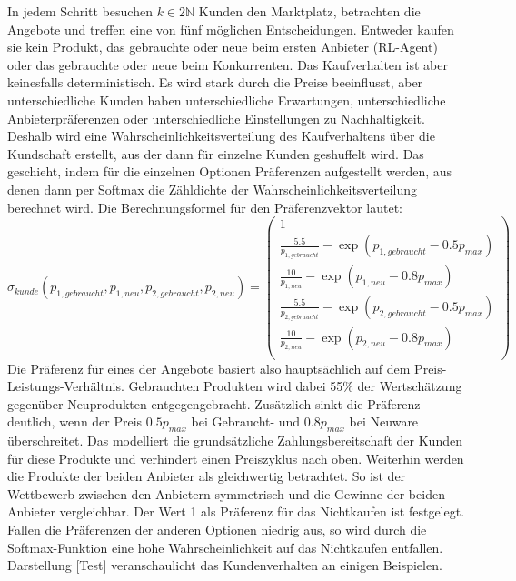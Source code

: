 In jedem Schritt besuchen $k \in 2\mathbb{N}$ Kunden den Marktplatz, betrachten die Angebote und treffen eine von fünf möglichen Entscheidungen.
Entweder kaufen sie kein Produkt, das gebrauchte oder neue beim ersten Anbieter (RL-Agent) oder das gebrauchte oder neue beim Konkurrenten.
Das Kaufverhalten ist aber keinesfalls deterministisch.
Es wird stark durch die Preise beeinflusst, aber unterschiedliche Kunden haben unterschiedliche Erwartungen, unterschiedliche Anbieterpräferenzen oder unterschiedliche Einstellungen zu Nachhaltigkeit.
Deshalb wird eine Wahrscheinlichkeitsverteilung des Kaufverhaltens über die Kundschaft erstellt, aus der dann für einzelne Kunden geshuffelt wird.
Das geschieht, indem für die einzelnen Optionen Präferenzen aufgestellt werden, aus denen dann per Softmax die Zähldichte der Wahrscheinlichkeitsverteilung berechnet wird.
Die Berechnungsformel für den Präferenzvektor lautet:
\begin{equation}
    \sigma_{kunde}(p_{1, gebraucht}, p_{1, neu}, p_{2, gebraucht}, p_{2, neu}) =
    \begin{pmatrix}
        1\\
        \frac{5.5}{p_{1, gebraucht}} - \exp{(p_{1, gebraucht} - 0.5 p_{max})}\\
        \frac{10}{p_{1, neu}} - \exp{(p_{1, neu} - 0.8 p_{max})}\\
        \frac{5.5}{p_{2, gebraucht}} - \exp{(p_{2, gebraucht} - 0.5 p_{max})}\\
        \frac{10}{p_{2, neu}} - \exp{(p_{2, neu} - 0.8 p_{max})}\\
    \end{pmatrix}
\end{equation}
Die Präferenz für eines der Angebote basiert also hauptsächlich auf dem Preis-Leistungs-Verhältnis.
Gebrauchten Produkten wird dabei 55\% der Wertschätzung gegenüber Neuprodukten entgegengebracht.
Zusätzlich sinkt die Präferenz deutlich, wenn der Preis $0.5 p_{max}$ bei Gebraucht- und $0.8 p_{max}$ bei Neuware überschreitet.
Das modelliert die grundsätzliche Zahlungsbereitschaft der Kunden für diese Produkte und verhindert einen Preiszyklus nach oben.
Weiterhin werden die Produkte der beiden Anbieter als gleichwertig betrachtet.
So ist der Wettbewerb zwischen den Anbietern symmetrisch und die Gewinne der beiden Anbieter vergleichbar.
Der Wert 1 als Präferenz für das Nichtkaufen ist festgelegt.
Fallen die Präferenzen der anderen Optionen niedrig aus, so wird durch die Softmax-Funktion eine hohe Wahrscheinlichkeit auf das Nichtkaufen entfallen.
Darstellung [Test] veranschaulicht das Kundenverhalten an einigen Beispielen.

